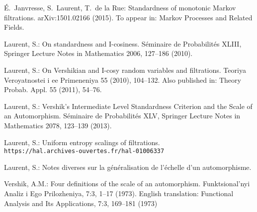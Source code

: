 \documentclass[12pt,a4paper]{article}
\begin{document}
\begin{thebibliography}{99.}

\'E.~Janvresse, S.~Laurent, T.~de la Rue: 
Standardness of monotonic Markov filtrations. 
	arXiv:1501.02166 (2015). 
To appear in: Markov Processes and Related Fields. 

 Laurent, S.: 
On standardness and I-cosiness. S\'eminaire de Probabilit\'es XLIII, 
Springer Lecture Notes in Mathematics 2006, 
127--186 (2010).

 Laurent, S.: 
On Vershikian and I-cosy random variables and filtrations.
Teoriya Veroyatnostei i ee Primeneniya 55 (2010), 104--132. 
Also published in: Theory Probab. Appl. 55 (2011), 54--76.

Laurent, S.: 
Vershik's Intermediate Level Standardness Criterion and the Scale of an Automorphism. 
S\'eminaire de Probabilit\'es XLV,
Springer Lecture Notes in Mathematics 2078,
123--139 (2013).

Laurent, S.: 
Uniform entropy scalings of filtrations. \\
\verb+https://hal.archives-ouvertes.fr/hal-01006337+ 

Laurent, S.: 
Notes diverses sur la généralisation de l'échelle d'un automorphisme. 

Vershik, A.M.: 
Four definitions of the scale of an automorphism. 
Funktsional'nyi Analiz i Ego Prilozheniya, 7:3, 
1--17 (1973). 
English translation:    
Functional Analysis and Its Applications, 7:3, 169--181 (1973)


\end{thebibliography}
\end{document}

